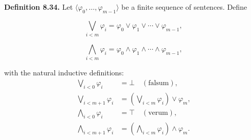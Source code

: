 \textbf{Definition 8.34.} Let $\langle \varphi_0, \ldots, \varphi_{m-1} \rangle$ be a finite sequence of sentences. Define

$$\bigvee_{i < m} \varphi_i = \varphi_0 \lor \varphi_1 \lor \cdots \lor \varphi_{m-1},$$

$$\bigwedge_{i < m} \varphi_i = \varphi_0 \land \varphi_1 \land \cdots \land \varphi_{m-1},$$

with the natural inductive definitions:
\begin{align*}
\bigvee_{i < 0} \varphi_i &= \bot \quad (\text{falsum}),\\
\bigvee_{i < m+1} \varphi_i &= \left(\bigvee_{i < m} \varphi_i\right) \lor \varphi_m,\\[4pt]
\bigwedge_{i < 0} \varphi_i &= \top \quad (\text{verum}),\\
\bigwedge_{i < m+1} \varphi_i &= \left(\bigwedge_{i < m} \varphi_i\right) \land \varphi_m.
\end{align*}
